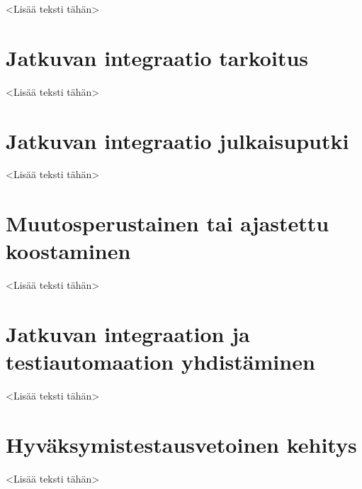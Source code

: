 <Lisää teksti tähän>

\section{Jatkuvan integraatio tarkoitus}

<Lisää teksti tähän>

\section{Jatkuvan integraatio julkaisuputki}

<Lisää teksti tähän>

\section{Muutosperustainen tai ajastettu koostaminen}

<Lisää teksti tähän>

\section{Jatkuvan integraation ja testiautomaation yhdistäminen}

<Lisää teksti tähän>

\section{Hyväksymistestausvetoinen kehitys}

<Lisää teksti tähän>
